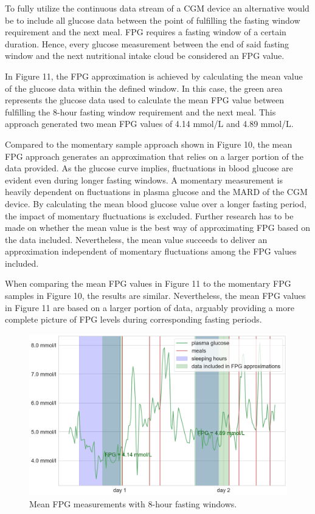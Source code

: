 \documentclass[english, 12pt, a4paper, elec, utf8, a-1b, online]{aaltothesis}
\begin{document}
To fully utilize the continuous data stream of a CGM device an alternative would be to include all glucose data between 
the point of fulfilling the fasting window requirement and the next meal. FPG requires a fasting window of a certain duration.
Hence, every glucose measurement between the end of said fasting window and the next nutritional intake cloud be considered an FPG value.

In Figure 11, the FPG approximation is achieved by calculating the mean value of the glucose data within the defined window. 
In this case, the green area represents the glucose data used to calculate the mean FPG value between fulfilling the 
8-hour fasting window requirement and the next meal. This approach generated two mean FPG values of 4.14 mmol/L and 4.89 mmol/L. 

Compared to the momentary sample approach shown in Figure 10, the mean FPG approach generates an approximation that relies on a larger portion of the data
provided. As the glucose curve implies, fluctuations in blood glucose are evident even during longer fasting windows. 
A momentary measurement is heavily dependent on fluctuations in plasma glucose and the MARD of the CGM device. 
By calculating the mean blood glucose value over a longer fasting period, the impact of momentary fluctuations is  excluded. 
Further research has to be made on whether the mean value is the best way of approximating FPG based on the data included. Nevertheless,
the mean value succeeds to deliver an approximation independent of momentary fluctuations among the FPG values included.

When comparing the mean FPG values in Figure 11 to the momentary FPG samples in Figure 10, the results are similar. Nevertheless, the mean FPG values 
in Figure 11 are based on a larger portion of data, arguably providing a more complete picture of FPG levels during corresponding fasting periods.  

\begin{figure}[H]
\centering
\includegraphics[width=14cm]{images/user_glucose_and_fpg2.png}
\caption{Mean FPG measurements with 8-hour fasting windows.}
\end{figure}
\end{document}
